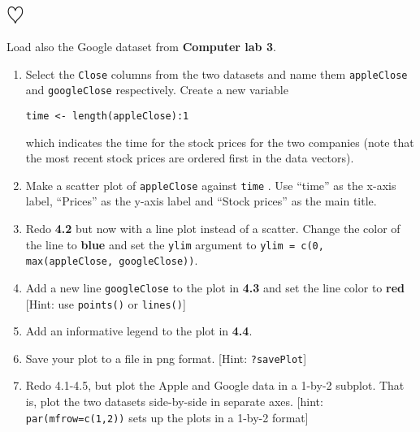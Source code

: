 \documentclass[a4paper]{article}
\begin{document}
\section{$\heartsuit$}
Load also the Google dataset from \textbf{Computer lab 3}.
\begin{enumerate}
\item Select the \texttt{Close} columns from the two datasets and name them
  \texttt{appleClose} and \texttt{googleClose} respectively. Create a new
  variable
\begin{verbatim}
time <- length(appleClose):1
\end{verbatim}
which indicates the time for the stock prices for the two companies (note that the most
recent stock prices are ordered first in the data vectors).

\item Make a scatter plot of \texttt{appleClose} against \texttt{time}
. Use ``time'' as the x-axis label, ``Prices'' as the
y-axis label and ``Stock prices'' as the main title. 

\item Redo \textbf{4.2} but now with a line plot instead of a scatter. Change the color of
  the line to \textbf{blue} and set the \texttt{ylim} argument
  to \texttt{ylim = c(0, max(appleClose, googleClose))}.

\item Add a new line \texttt{googleClose} to the plot in \textbf{4.3} and set
  the line color to \textbf{red} [Hint: use \texttt{points()} or \texttt{lines()}]

\item Add an informative legend to the plot in \textbf{4.4}.

\item Save your plot to a file in png format. [Hint: \texttt{?savePlot}]

\item Redo 4.1-4.5, but plot the Apple and Google data in a 1-by-2 subplot. That is, plot the
  two datasets side-by-side in separate axes. [hint:
  \texttt{par(mfrow=c(1,2))} sets up the plots in a 1-by-2 format]
 
\end{enumerate}
\end{document}
